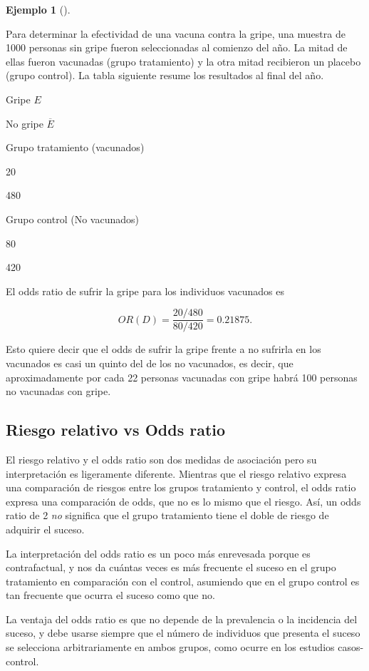 \documentclass[
  a4paper,
]{scrreport}
\theoremstyle{plain}
\theoremstyle{definition}
\theoremstyle{definition}
\newtheorem{example}{Ejemplo}[chapter]
\theoremstyle{remark}
\begin{document}
\begin{example}[]\protect\hypertarget{exm-odds-ratio}{}\label{exm-odds-ratio}

Para determinar la efectividad de una vacuna contra la gripe, una
muestra de 1000 personas sin gripe fueron seleccionadas al comienzo del
año. La mitad de ellas fueron vacunadas (grupo tratamiento) y la otra
mitad recibieron un placebo (grupo control). La tabla siguiente resume
los resultados al final del año.

Gripe \(E\)

No gripe \(\overline E\)

Grupo tratamiento (vacunados)

20

480

Grupo control (No vacunados)

80

420

El odds ratio de sufrir la gripe para los individuos vacunados es

\[OR(D) = \frac{20/480}{80/420} = 0.21875.\]

Esto quiere decir que el odds de sufrir la gripe frente a no sufrirla en
los vacunados es casi un quinto del de los no vacunados, es decir, que
aproximadamente por cada 22 personas vacunadas con gripe habrá 100
personas no vacunadas con gripe.

\end{example}

\subsection{Riesgo relativo vs Odds
ratio}\label{riesgo-relativo-vs-odds-ratio}

El riesgo relativo y el odds ratio son dos medidas de asociación pero su
interpretación es ligeramente diferente. Mientras que el riesgo relativo
expresa una comparación de riesgos entre los grupos tratamiento y
control, el odds ratio expresa una comparación de odds, que no es lo
mismo que el riesgo. Así, un odds ratio de 2 \emph{no} significa que el
grupo tratamiento tiene el doble de riesgo de adquirir el suceso.

La interpretación del odds ratio es un poco más enrevesada porque es
contrafactual, y nos da cuántas veces es más frecuente el suceso en el
grupo tratamiento en comparación con el control, asumiendo que en el
grupo control es tan frecuente que ocurra el suceso como que no.

La ventaja del odds ratio es que no depende de la prevalencia o la
incidencia del suceso, y debe usarse siempre que el número de individuos
que presenta el suceso se selecciona arbitrariamente en ambos grupos,
como ocurre en los estudios casos-control.
\end{document}
